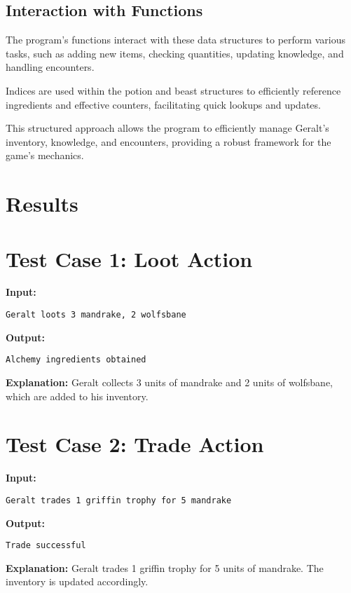 \documentclass{article}
\begin{document}
\subsection*{Interaction with Functions}

The program's functions interact with these data structures to perform various tasks, such as adding new items, checking quantities, updating knowledge, and handling encounters.

Indices are used within the potion and beast structures to efficiently reference ingredients and effective counters, facilitating quick lookups and updates.

This structured approach allows the program to efficiently manage Geralt's inventory, knowledge, and encounters, providing a robust framework for the game's mechanics.

\section{Results}

\section*{Test Case 1: Loot Action}

\textbf{Input:}
\begin{lstlisting}
Geralt loots 3 mandrake, 2 wolfsbane
\end{lstlisting}

\textbf{Output:}
\begin{lstlisting}
Alchemy ingredients obtained
\end{lstlisting}

\textbf{Explanation:} Geralt collects 3 units of mandrake and 2 units of wolfsbane, which are added to his inventory.

\section*{Test Case 2: Trade Action}

\textbf{Input:}
\begin{lstlisting}
Geralt trades 1 griffin trophy for 5 mandrake
\end{lstlisting}

\textbf{Output:}
\begin{lstlisting}
Trade successful
\end{lstlisting}

\textbf{Explanation:} Geralt trades 1 griffin trophy for 5 units of mandrake. The inventory is updated accordingly.
\end{document}
